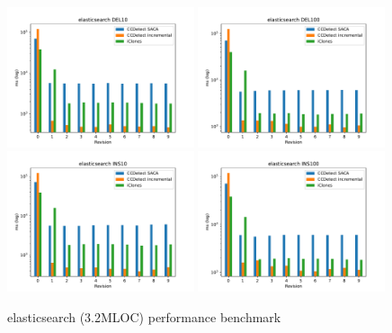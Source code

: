 \begin{figure}
    \begin{center}
        \includegraphics[width=0.49\textwidth]{figures/performancegraphs/elasticsearch_DEL10.pdf}
        \includegraphics[width=0.49\textwidth]{figures/performancegraphs/elasticsearch_DEL100.pdf}
        \includegraphics[width=0.49\textwidth]{figures/performancegraphs/elasticsearch_INS10.pdf}
        \includegraphics[width=0.49\textwidth]{figures/performancegraphs/elasticsearch_INS100.pdf}
    \end{center}
    \caption{elasticsearch (3.2MLOC) performance benchmark}
    \label{fig:neo4j}
\end{figure}

